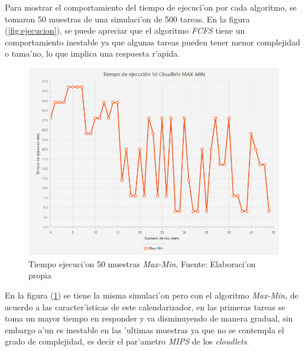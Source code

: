 Para mostrar el comportamiento del tiempo de ejecuci'on por cada algoritmo, se tomaron 50 muestras de una simulaci'on de 500 tareas. En la figura (\ref{fig:ejecucion}), se puede apreciar que el algoritmo \textit{FCFS} tiene un comportamiento inestable ya que algunas tareas pueden tener menor complejidad o tama'no, lo que implica una respuesta r'apida.

\newpage

\setcounter{figure}{17}
\renewcommand\thefigure{\arabic{figure}}
\begin{figure}[h!] 
	\centering
	\includegraphics[scale=0.5]{media/max-min}
	\caption{Tiempo ejecuci'on 50 muestras \textit{Max-Min}, Fuente: Elaboraci'on propia}
	\label{fig:maxmin}
\end{figure}


 En la figura (\ref{fig:maxmin}) se tiene la misma simulaci'on pero con el algoritmo \textit{Max-Min}, de acuerdo a las caracter'isticas de este calendarizador, en las primeras tareas se toma un mayor tiempo en responder y va disminuyendo de manera gradual, sin embargo a'un es inestable en las 'ultimas muestras ya que no se contempla el grado de complejidad, es decir el par'ametro \textit{MIPS} de los \textit{cloudlets}.



